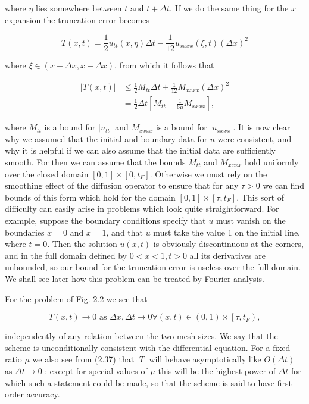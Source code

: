\documentclass[10pt]{article}
\begin{document}
where \(\eta\) lies somewhere between \(t\) and \(t+\Delta t\). If we do the same thing for the \(x\) expansion the truncation error becomes

\[
T(x, t)=\frac{1}{2} u_{t t}(x, \eta) \Delta t-\frac{1}{12} u_{x x x x}(\xi, t)(\Delta x)^{2}
\]

where \(\xi \in(x-\Delta x, x+\Delta x)\), from which it follows that

\[
\begin{aligned}
|T(x, t)| & \leq \frac{1}{2} M_{t t} \Delta t+\frac{1}{12} M_{x x x x}(\Delta x)^{2} \\
& =\frac{1}{2} \Delta t\left[M_{t t}+\frac{1}{6 \mu} M_{x x x x}\right],
\end{aligned}
\]

where \(M_{t t}\) is a bound for \(\left|u_{t t}\right|\) and \(M_{x x x x}\) is a bound for \(\left|u_{x x x x}\right|\). It is now clear why we assumed that the initial and boundary data for \(u\) were consistent, and why it is helpful if we can also assume that the initial data are sufficiently smooth. For then we can assume that the bounds \(M_{t t}\) and \(M_{x x x x}\) hold uniformly over the closed domain \([0,1] \times\left[0, t_{F}\right]\). Otherwise we must rely on the smoothing effect of the diffusion operator to ensure that for any \(\tau>0\) we can find bounds of this form which hold for the domain \([0,1] \times\left[\tau, t_{F}\right]\). This sort of difficulty can easily arise in problems which look quite straightforward. For example, suppose the boundary conditions specify that \(u\) must vanish on the boundaries \(x=0\) and \(x=1\), and that \(u\) must take the value 1 on the initial line, where \(t=0\). Then the solution \(u(x, t)\) is obviously discontinuous at the corners, and in the full domain defined by \(0<x<1, t>0\) all its derivatives are unbounded, so our bound for the truncation error is useless over the full domain. We shall see later how this problem can be treated by Fourier analysis.

For the problem of Fig. 2.2 we see that

\[
T(x, t) \rightarrow 0 \text { as } \Delta x, \Delta t \rightarrow 0 \forall(x, t) \in(0,1) \times\left[\tau, t_{F}\right),
\]

independently of any relation between the two mesh sizes. We say that the scheme is unconditionally consistent with the differential equation. For a fixed ratio \(\mu\) we also see from (2.37) that \(|T|\) will behave asymptotically like \(O(\Delta t)\) as \(\Delta t \rightarrow 0\) : except for special values of \(\mu\) this will be the highest power of \(\Delta t\) for which such a statement could be made, so that the scheme is said to have first order accuracy.
\end{document}
